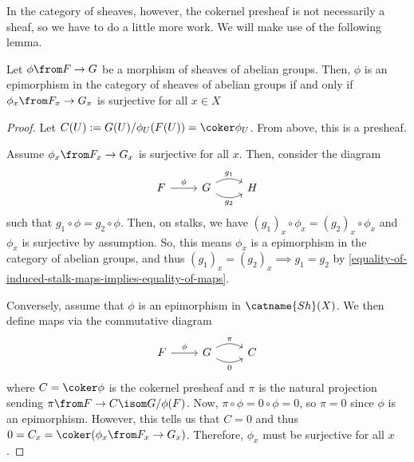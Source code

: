 \documentclass[11pt,leqno,oneside]{amsbook}
\renewcommand{\F}{F} %
\newcommand{\G}{G}
\renewcommand{\H}{H}
\numberwithin{thm}{section}
\begin{document}
In the category of sheaves, however, the cokernel presheaf is not
necessarily a sheaf, so we have to do a little more work. We will make
use of the following lemma.
\begin{prop}
  Let \(\phi \from \F \to \G\) be a morphism of sheaves of abelian
  groups. Then, \(\phi\) is an epimorphism in the category of sheaves of
    abelian groups if and only if \(\phi_x \from \F_x \to \G_x\) is surjective for all \(x \in X\)
\end{prop}
\begin{proof}
    Let \(C(U) := \G(U)/\phi_U(\F(U)) = \coker \phi_U\). From above,
    this is a presheaf.


    Assume \(\phi_x \from \F_x \to \G_x\) is surjective for all
    \(x\). Then, consider the diagram \[
      \begin{tikzcd}
        \F \ar[r, "\phi"] & \G \ar[r, bend left, "g_1"] \ar[r, bend
        right, swap, "g_2"]
        & \H
      \end{tikzcd}
    \]
    such that \(g_1 \circ \phi = g_2 \circ \phi\). Then, on stalks, we
    have \((g_1)_x \circ \phi_x = (g_2)_x \circ \phi_x\) and
    \(\phi_x\) is surjective by assumption. So, this means
    \(\phi_x\) is a epimorphism in the category of abelian groups, and
    thus \((g_1)_x = (g_2)_x \implies g_1 = g_2\) by
    \ref{equality-of-induced-stalk-maps-implies-equality-of-maps}.

    Conversely, assume that \(\phi\) is an epimorphism in
    \(\catname{Sh}(X)\). We then define maps via the commutative
    diagram \[
      \begin{tikzcd}
        \F \ar[r, "\phi"] & \G \ar[r, bend left, "\pi"] \ar[r, bend
        right, swap, "0"] & C 
      \end{tikzcd}
    \]
    where \(C = \coker \phi\) is the cokernel presheaf and \(\pi\) is
    the natural projection sending \(\pi \from \F \to C \isom
    \G/\phi(F)\). Now, \(\pi \circ \phi = 0 \circ \phi = 0\), so
    \(\pi = 0\) since \(\phi\) is an epimorphism. However, this tells
    us that \(C = 0\) and thus  \(0 = C_x = \coker(\phi_x \from \F_x
    \to \G_x)\). Therefore, \(\phi_x\) must be surjective for all \(x\).
\end{proof}
\end{document}
